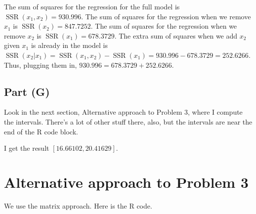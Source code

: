 \documentclass[
]{article}
\begin{document}
The sum of squares for the regression for the full model is
\(\operatorname{SSR}(x_1,x_2) = 930.996\). The sum of squares for the
regression when we remove \(x_1\) is
\(\operatorname{SSR}(x_2) = 847.7252\). The sum of squares for the
regression when we remove \(x_2\) is
\(\operatorname{SSR}(x_1) = 678.3729\). The extra sum of squares when we
add \(x_2\) given \(x_1\) is already in the model is
\(\operatorname{SSR}(x_2|x_1) = \operatorname{SSR}(x_1,x_2) - \operatorname{SSR}(x_1) = 930.996 - 678.3729 = 252.6266\).
Thus, plugging them in, \(930.996 = 678.3729+252.6266\).

\hypertarget{part-g}{%
\subsection{Part (G)}\label{part-g}}


Look in the next section, Alternative approach to Problem 3, where I
compute the intervals. There's a lot of other stuff there, also, but the
intervals are near the end of the R code block.

I get the result \([16.66102, 20.41629]\).

\hypertarget{alternative-approach-to-problem-3}{%
\section{Alternative approach to Problem
3}\label{alternative-approach-to-problem-3}}

We use the matrix approach. Here is the R code.
\end{document}
